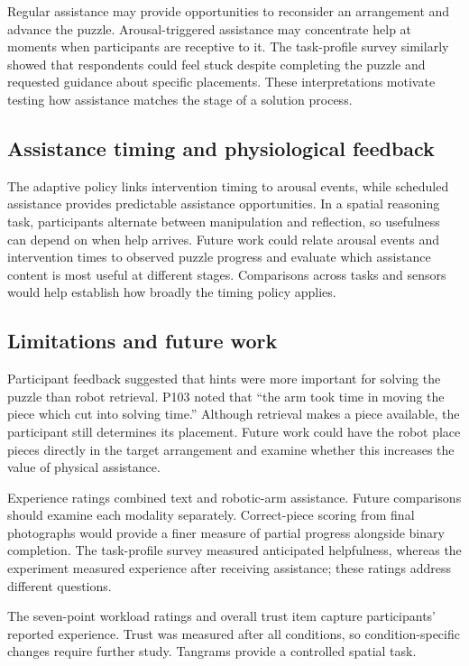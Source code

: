 \documentclass[sigconf,anonymous]{aamas}
\begin{document}
Regular assistance may provide opportunities to reconsider an arrangement and advance the puzzle. Arousal-triggered assistance may concentrate help at moments when participants are receptive to it. The task-profile survey similarly showed that respondents could feel stuck despite completing the puzzle and requested guidance about specific placements. These interpretations motivate testing how assistance matches the stage of a solution process.

\subsection{Assistance timing and physiological feedback}

The adaptive policy links intervention timing to arousal events, while scheduled assistance provides predictable assistance opportunities. In a spatial reasoning task, participants alternate between manipulation and reflection, so usefulness can depend on when help arrives. Future work could relate arousal events and intervention times to observed puzzle progress and evaluate which assistance content is most useful at different stages. Comparisons across tasks and sensors would help establish how broadly the timing policy applies.

\subsection{Limitations and future work}

Participant feedback suggested that hints were more important for solving the puzzle than robot retrieval. P103 noted that ``the arm took time in moving the piece which cut into solving time.'' Although retrieval makes a piece available, the participant still determines its placement. Future work could have the robot place pieces directly in the target arrangement and examine whether this increases the value of physical assistance.

Experience ratings combined text and robotic-arm assistance. Future comparisons should examine each modality separately. Correct-piece scoring from final photographs would provide a finer measure of partial progress alongside binary completion. The task-profile survey measured anticipated helpfulness, whereas the experiment measured experience after receiving assistance; these ratings address different questions.

The seven-point workload ratings and overall trust item capture participants' reported experience. Trust was measured after all conditions, so condition-specific changes require further study. Tangrams provide a controlled spatial task.
\end{document}
